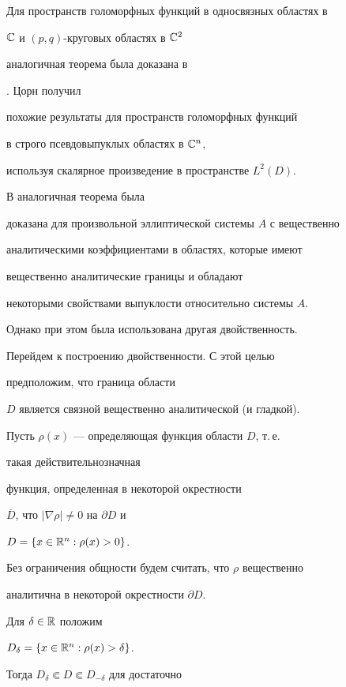 Для пространств голоморфных функций в односвязных областях в


$\Bbb C$ и $(p,q)$-круговых областях в ${\Bbb C}^2$


аналогичная теорема была доказана в


\cite{AizeGind1}. Цорн \cite{Zorn} получил


похожие результаты для пространств голоморфных функций


в строго псевдовыпуклых областях в ${\Bbb C}^n$,


используя скалярное произведение в пространстве $L^2 (D)$.





В \cite{NaciShla1Tarkh1} аналогичная теорема была


доказана для произвольной эллиптической системы $A$ с вещественно


аналитическими коэффициентами в областях, которые имеют


вещественно аналитические границы и обладают


некоторыми свойствами выпуклости относительно системы $A$.


Однако при этом была использована другая двойственность.





Перейдем к построению двойственности. С этой целью


предположим, что граница области


$D$ является связной вещественно аналитической (и гладкой).


Пусть $\rho (x)$ --- определяющая функция области $D$, т.\,е.


такая действительнозначная


функция, определенная в некоторой окрестности


$\overline D$, что $|\nabla \rho | \ne 0$ на $\partial D$ и


$D = \{ x\in {\Bbb R}^n: \rho (x) > 0 \}$.


Без ограничения общности будем считать, что $\rho$ вещественно 


аналитична в некоторой окрестности $\partial D$.





Для $\delta \in \Bbb R$ положим


$D_\delta = \{ x\in {\Bbb R}^n: \rho (x) > \delta \}$.


Тогда $D_\delta \Subset D\Subset D_{-\delta}$ для достаточно


